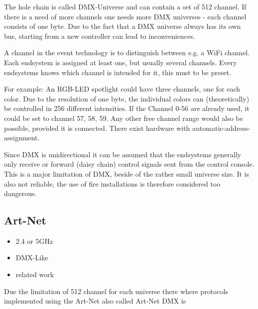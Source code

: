 \documentclass[]{ccs-thesis}
\begin{document}
The hole chain is called DMX-Universe and can contain a set of 512 channel. 
If there is a need of more channels one needs more DMX universes - each channel consists of one byte.
Due to the fact that a DMX universe always has its own bus, starting from a new controller can lead to inconveniences.

A channel in the event technology is to distinguish between e.g. a WiFi channel.
Each endsystem is assigned at least one, but usually several channels.
Every endsystems knows which channel is intended for it, this must to be preset.

For example: An RGB-LED spotlight could have three channels, one for each color.
Due to the resolution of one byte, the individual colors can (theoretically) be controlled in 256 different intensities.
If the Channel 0-56 are already used, it could be set to channel 57, 58, 59.
Any other free channel range would also be possible, provided it is connected.
There exist hardware with automatic-address-assignment.


Since \ac{DMX} is unidirectional it can be assumed that the endsystems generally only receive or forward (daisy chain) control signals sent from the control console.
This is a major limitation of DMX, beside of the rather small universe size.
It is also not reliable, the use of fire installations is therefore considered too dangerous.

\subsection{Art-Net}
\label{sec:artnet}
\begin{itemize}
\item 2.4 or 5GHz
\item DMX-Like
\item related work
\end{itemize}

Due the limitation of 512 channel for each universe there where protocols implemented using the 
Art-Net also called Art-Net DMX is 
\end{document}
